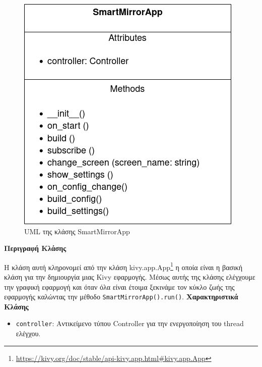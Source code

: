 \begin{figure}[h]
    \centering
    \includegraphics[scale=0.7]{images/chapter4/uml_diagrams/SmartMirrorApp.png}
    \caption{UML της κλάσης SmartMirrorApp}
    \label{fig:smartmirrorapp}
\end{figure}
\noindent\textbf{Περιγραφή Κλάσης}

Η κλάση αυτή κληρονομεί από την κλάση kivy.app.App\footnote{\href{https://kivy.org/doc/stable/api-kivy.app.html\#kivy.app.App}{https://kivy.org/doc/stable/api-kivy.app.html\#kivy.app.App}} η οποία είναι η βασική κλάση για την δημιουργία μιας Kivy εφαρμογής. Μέσως αυτής της κλάσης ελέγχουμε την γραφική εφαρμογή και όταν όλα είναι έτοιμα ξεκινάμε τον κύκλο ζωής της εφαρμογής καλώντας την μέθοδο \texttt{SmartMirrorApp().run()}.
\noindent\textbf{Χαρακτηριστικά Κλάσης}
\begin{itemize}
    \item \texttt{controller}: Αντικείμενο τύπου Controller για την ενεργοποίηση του thread ελέγχου.
\end{itemize}

